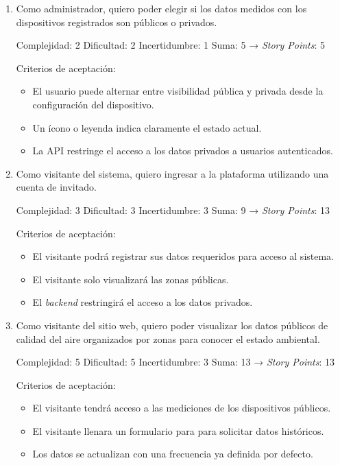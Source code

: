\documentclass[
11pt, %
]{charter}
\begin{document}
\begin{enumerate}
	\item Como administrador, quiero poder elegir si los datos medidos con los dispositivos registrados son públicos o privados.

	Complejidad: 2
	Dificultad: 2
	Incertidumbre: 1
	Suma: 5 → \textit{Story Points}: 5

	Criterios de aceptación:
	\begin{itemize}
		\item El usuario puede alternar entre visibilidad pública y privada desde la configuración del dispositivo.
		\item Un ícono o leyenda indica claramente el estado actual.
		\item La API restringe el acceso a los datos privados a usuarios autenticados.

	\end{itemize}
	\item Como visitante del sistema, quiero ingresar a la plataforma utilizando una cuenta de invitado.

	Complejidad: 3
	Dificultad: 3
	Incertidumbre: 3
	Suma: 9 → \textit{Story Points}: 13

	Criterios de aceptación:
	\begin{itemize}
		\item El visitante podrá registrar sus datos requeridos para acceso al sistema.
		\item El visitante solo visualizará las zonas públicas.
		\item El \textit{backend} restringirá el acceso a los datos privados.
	\end{itemize}

	\item Como visitante del sitio web, quiero poder visualizar los datos públicos de calidad del aire organizados por zonas para conocer el estado ambiental.

	Complejidad: 5
	Dificultad: 5
	Incertidumbre: 3
	Suma: 13 → \textit{Story Points}: 13

	Criterios de aceptación:
	\begin{itemize}
		\item El visitante tendrá acceso a las mediciones de los dispositivos públicos.
		\item El visitante llenara un formulario para para solicitar datos históricos.
		\item Los datos se actualizan con una frecuencia ya definida por defecto.
	\end{itemize}
\end{enumerate}
\end{document}
